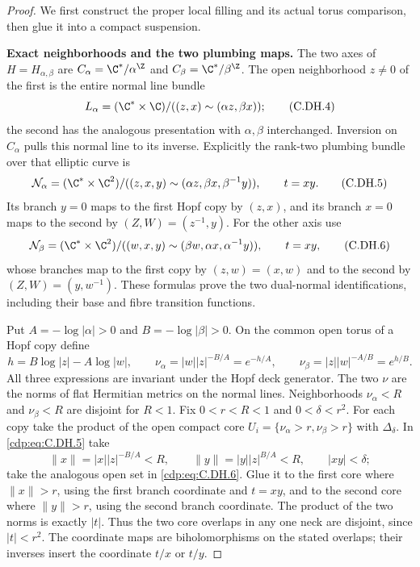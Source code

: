 \begin{proof}
We first construct the proper local filling
and its actual torus comparison, then glue
it into a compact suspension.

\par\medskip\noindent\textbf{Exact neighborhoods and the two plumbing maps.}
The two axes of $H=H_{\alpha,\beta}$ are
$C_\alpha=\C^*/\alpha^{\Z}$ and
$C_\beta=\C^*/\beta^{\Z}$. The open
neighborhood $z\ne0$ of the first is
the entire normal line bundle
\[
 L_\alpha=(\C^*\times\C)/
         ((z,x)\sim(\alpha z,\beta x));
                                                               \tag{C.DH.4}\label{cdp:eq:C.DH.4}
\]
the second has the analogous presentation
with $\alpha,\beta$ interchanged.
Inversion on $C_\alpha$ pulls this
normal line to its inverse. Explicitly
the rank-two plumbing bundle over that
elliptic curve is
\[
 \mathcal N_\alpha=(\C^*\times\C^2)/
       ((z,x,y)\sim(\alpha z,\beta x,\beta^{-1}y)),
                         \qquad t=xy.               \tag{C.DH.5}\label{cdp:eq:C.DH.5}
\]
Its branch $y=0$ maps to the first
Hopf copy by $(z,x)$, and its branch
$x=0$ maps to the second by
$(Z,W)=(z^{-1},y)$.
For the other axis use
\[
 \mathcal N_\beta=(\C^*\times\C^2)/
       ((w,x,y)\sim(\beta w,\alpha x,\alpha^{-1}y)),
                         \qquad t=xy,                \tag{C.DH.6}\label{cdp:eq:C.DH.6}
\]
whose branches map to the first
copy by $(z,w)=(x,w)$ and to the
second by $(Z,W)=(y,w^{-1})$.
These formulas prove the two dual-normal
identifications, including their
base and fibre transition functions.

Put $A=-\log|\alpha|>0$ and
$B=-\log|\beta|>0$. On the common
open torus of a Hopf copy define
\[
 h=B\log|z|-A\log|w|,\qquad
 \nu_\alpha=|w||z|^{-B/A}=e^{-h/A},\qquad
 \nu_\beta=|z||w|^{-A/B}=e^{h/B}.        \tag{C.DH.7}\label{cdp:eq:C.DH.7}
\]
All three expressions are invariant
under the Hopf deck generator.
The two $\nu$ are the norms of
flat Hermitian metrics on the
normal lines. Neighborhoods
$\nu_\alpha<R$ and $\nu_\beta<R$
are disjoint for $R<1$.
Fix $0<r<R<1$ and $0<\delta<r^2$.
For each copy take the product
of the open compact core
$U_i=\{\nu_\alpha>r,\nu_\beta>r\}$
with $\Delta_\delta$.
In \eqref{cdp:eq:C.DH.5} take
\[
 \|x\|=|x||z|^{-B/A}<R,
 \qquad \|y\|=|y||z|^{B/A}<R,
 \qquad |xy|<\delta;                                \tag{C.DH.8}\label{cdp:eq:C.DH.8}
\]
take the analogous open set in
\eqref{cdp:eq:C.DH.6}. Glue it to the first
core where $\|x\|>r$, using the
first branch coordinate and
$t=xy$, and to the second core
where $\|y\|>r$, using the second
branch coordinate. The product
of the two norms is exactly
$|t|$. Thus the two core
overlaps in any one neck are
disjoint, since $|t|<r^2$.
The coordinate maps are
biholomorphisms on the stated
overlaps; their inverses insert
the coordinate $t/x$ or $t/y$.


\end{proof}
